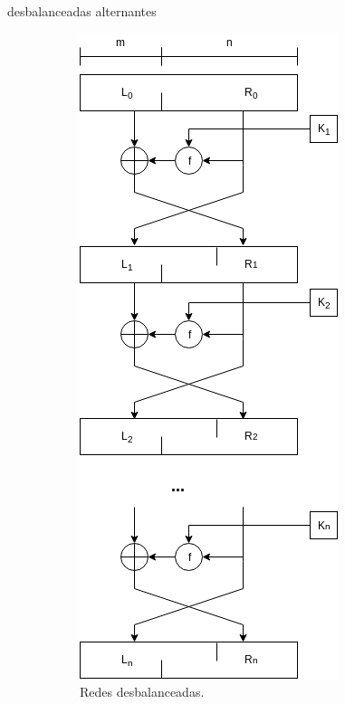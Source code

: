 {desbalanceadas}
{alternantes}

\begin{figure}
  \centering
  \begin{subfigure}{0.45\textwidth}
    \begin{center}
      \includegraphics[width=0.5\linewidth]
        {../../../../diagramas_comunes/redes_feistel/desbalanceadas.png}
      \caption{Redes desbalanceadas.}
      \label{feistel:desbalanceadas}
    \end{center}
  \end{subfigure}
  \begin{subfigure}{0.45\textwidth}
    \begin{center}

\end{center}
\end{subfigure}
\end{figure}
